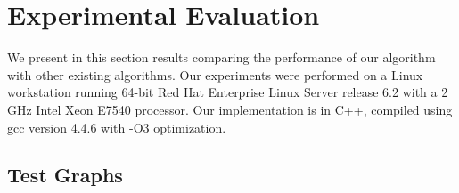 \section{Experimental Evaluation}
\label{sec:experiments}

We present in this section results comparing the performance of our algorithm
with other existing algorithms. Our experiments were performed on a Linux workstation running 64-bit Red Hat Enterprise Linux Server release 6.2 with a 2 GHz Intel Xeon E7540 processor. Our implementation is in C++, compiled using gcc version 4.4.6 with -O3 optimization.


\subsection{Test Graphs}

